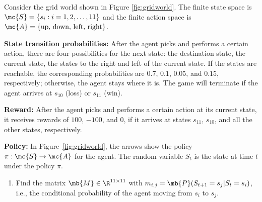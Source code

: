 \begin{exercise}\label{exercise:GridWorld}

    Consider the grid world shown in Figure \ref{fig:gridworld}. The finite state space is $\mc{S} = \{s_i:i=1,2,\dots, 11\}$ and the finite action space is $\mc{A} = \{\mbox{up, down, left, right}\}$.

    \vspace{0.5em}\noindent\textbf{State transition probabilities:} After the agent picks and performs a certain action, there are four possibilities for the next state: the destination state, the current state, the states to the right and left of the current state. If the states are reachable, the corresponding probabilities are $0.7$, $0.1$, $0.05$, and $0.15$, respectively; otherwise, the agent stays where it is. The game will terminate if the agent arrives at $s_{10}$ (loss) or $s_{11}$ (win).

    \vspace{0.5em}\noindent\textbf{Reward:} After the agent picks and performs a certain action at its current state, it receives rewards of $100$, $-100$, and $0$, if it arrives at states $s_{11}$, $s_{10}$, and all the other states, respectively.

    \vspace{0.5em}\noindent\textbf{Policy:} In Figure~\ref{fig:gridworld}, the arrows show the policy $\pi:\mc{S}\rightarrow\mc{A}$ for the agent. The random variable $S_t$ is the state at time $t$ under the policy $\pi$.

    \begin{enumerate}
        \item Find the matrix $\mb{M}\in\R^{11\times 11}$ with $m_{i,j}=\mb{P}(S_{t+1}=s_j|S_t=s_i)$, i.e., the conditional probability of the agent moving from $s_i$ to $s_j$.


\end{enumerate}
\end{exercise}
